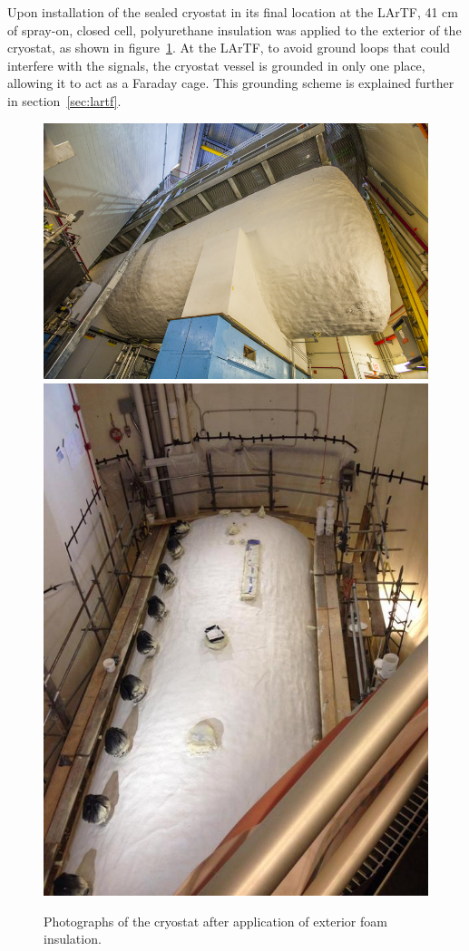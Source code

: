 Upon installation of the sealed cryostat in its final location at the LArTF, 41 cm of spray-on, closed cell, polyurethane insulation was applied to the exterior of the cryostat, as shown in figure~\ref{fig:cryostat-foam}.  At the LArTF, to avoid ground loops that could interfere with the \lartpc signals, the cryostat vessel is grounded in only one place, allowing it to act as a Faraday cage.  This grounding scheme is explained further in section~\ref{sec:lartf}.

\begin{figure}[htb]
\centering	
\includegraphics[width=0.68\linewidth]{figures/14-0222-03D.jpg}\\
\includegraphics[width=0.68\linewidth]{figures/foam2.jpg}
\caption{Photographs of the cryostat after application of exterior foam insulation.}
\label{fig:cryostat-foam}
\end{figure}


